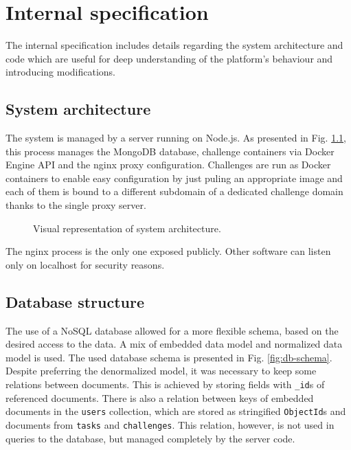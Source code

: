 \chapter{Internal specification}
\label{chap:internal-specification}

The internal specification includes details regarding the system architecture and code which are useful for deep understanding of the platform's behaviour and introducing modifications.


\section{System architecture}

The system is managed by a server running on Node.js. As presented in Fig. \ref{fig:system-architecture}, this process manages the MongoDB database, challenge containers via Docker Engine API and the nginx proxy configuration. Challenges are run as Docker containers to enable easy configuration by just puling an appropriate image and each of them is bound to a different subdomain of a dedicated challenge domain thanks to the single proxy server.

\begin{figure}
    \centering
    
    \caption{Visual representation of system architecture.}
    \label{fig:system-architecture}
\end{figure}

The nginx process is the only one exposed publicly. Other software can listen only on localhost for security reasons.

\section{Database structure}

The use of a NoSQL database allowed for a more flexible schema, based on the desired access to the data. A mix of embedded data model and normalized data model is used. The used database schema is presented in Fig. \ref{fig:db-schema}. Despite preferring the denormalized model, it was necessary to keep some relations between documents. This is achieved by storing fields with \texttt{\_id}s of referenced documents. There is also a relation between keys of embedded documents in the \texttt{users} collection, which are stored as stringified \texttt{ObjectId}s and documents from \texttt{tasks} and \texttt{challenges}. This relation, however, is not used in queries to the database, but managed completely by the server code.

